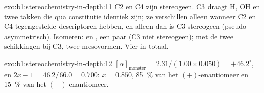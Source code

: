 \begin{solution}{exo:b1:stereochemistry-in-depth:11}
C2 en C4 zijn stereogeen. C3 draagt H, OH en twee takken die qua
constitutie identiek zijn; ze verschillen alleen wanneer C2 en C4
tegengestelde descriptoren hebben, en alleen dan is C3 stereogeen
(pseudo-asymmetrisch). Isomeren:  en , een paar
 (C3 niet stereogeen);  met de twee schikkingen
bij C3, twee mesovormen. Vier in totaal.
\end{solution}

\begin{solution}{exo:b1:stereochemistry-in-depth:12}
$[\alpha]_{\text{monster}} = 2.31/(1.00 \times 0.050) = +46.2^\circ$, en
$2x - 1 = 46.2/66.0 = 0.700$: $x = 0.850$, \qty{85}{\percent} van het
$(+)$-enantiomeer en \qty{15}{\percent} van het $(-)$-enantiomeer.
\end{solution}

